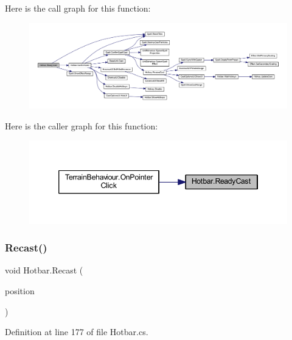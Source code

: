 Here is the call graph for this function\+:
\nopagebreak
\begin{figure}[H]
\begin{center}
\leavevmode
\includegraphics[width=350pt]{class_hotbar_a5ac379c585126b8e0e35c061b3388ecf_cgraph}
\end{center}
\end{figure}
Here is the caller graph for this function\+:
\nopagebreak
\begin{figure}[H]
\begin{center}
\leavevmode
\includegraphics[width=346pt]{class_hotbar_a5ac379c585126b8e0e35c061b3388ecf_icgraph}
\end{center}
\end{figure}
\mbox{\label{class_hotbar_acda305961d329d3b329dbe4247539ef5}} 
\subsubsection{\texorpdfstring{Recast()}{Recast()}}
{\footnotesize\ttfamily void Hotbar.\+Recast (\begin{DoxyParamCaption}\item[{Vector2\+Int}]{position }\end{DoxyParamCaption})}



Definition at line 177 of file Hotbar.\+cs.


